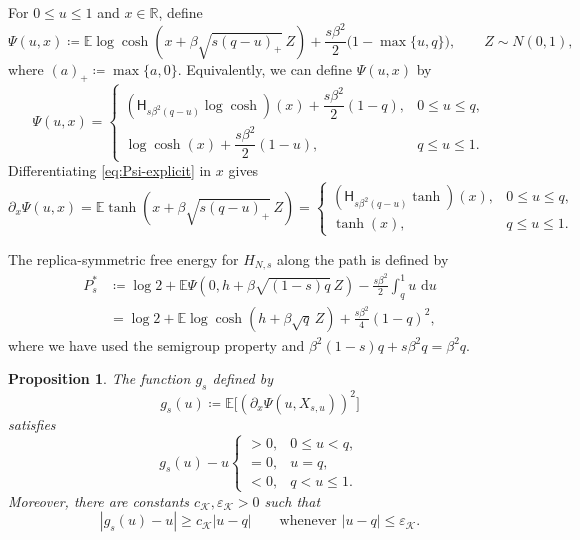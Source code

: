\documentclass[11pt]{article}
\newtheorem{proposition}[theorem]{Proposition}
\numberwithin{equation}{section}
\newcommand{\E}{\mathbb{E}}
\newcommand{\1}{\mathbf 1}
\newcommand{\cK}{\mathcal K}
\newcommand{\dd}{\,\mathrm d}
\begin{document}
For $0\le u\le1$ and $x\in\mathbb R$, define
\begin{equation}
 \Psi(u,x)
 \coloneqq
 \E\log\cosh\left(
 x+\beta\sqrt{s(q-u)_+}\,Z
 \right)
 +\frac{s\beta^2}{2}\bigl(1-\max\{u,q\}\bigr),
 \qquad Z\sim N(0,1),
 \label{eq:Psi-explicit}
\end{equation}
where $(a)_+\coloneqq\max\{a,0\}$.  Equivalently, we can define $\Psi (u,x)$ by
\[
 \Psi(u,x)
 =
 \begin{cases}
  (\mathsf H_{s\beta^2(q-u)}\log\cosh)(x)
  +\dfrac{s\beta^2}{2}(1-q),
  &0\le u\le q,\\[2mm]
  \log\cosh(x)+\dfrac{s\beta^2}{2}(1-u),
  &q\le u\le1.
 \end{cases}
\]
Differentiating \eqref{eq:Psi-explicit} in $x$ gives
\begin{equation}
 \partial_x\Psi(u,x)
 =
 \mathbb{E}\tanh\left(
 x+\beta\sqrt{s(q-u)_+}\,Z
 \right)
 =
 \begin{cases}
  (\mathsf H_{s\beta^2(q-u)}\tanh)(x),
      &0\le u\le q,\\
  \tanh(x),&q\le u\le1.
 \end{cases}
 \label{eq:Psi-x}
\end{equation}

The replica-symmetric free energy for $H_{N,s}$ along the path is defined by
\begin{align}
 P_s^*& \coloneqq\log2+
 \E\Psi(0,h+\beta\sqrt{(1-s)q}\,Z)
 -\frac{s\beta^2}{2}\int_q^1u\,\dd u
 \label{eq:scalartrial}\\
 &= \log2+\E\log\cosh(h+\beta\sqrt q\,Z)
 +\frac{s\beta^2}{4}(1-q)^2,
 \label{eq:RSpathvalue}
\end{align}
where we have used the semigroup property and
$\beta^2(1-s)q+s\beta^2q=\beta^2q$.


\begin{proposition}
\label{prop:pathRS}
The function $g_s$ defined by
\begin{equation}
 g_s(u)\coloneqq\E\bigl[(\partial_x\Psi(u,X_{s,u}))^2\bigr]
 \label{eq:gs-def}
\end{equation}
satisfies
\begin{equation}
 g_s(u)-u
 \begin{cases}
 >0,&0\le u<q,\\
 =0,&u=q,\\
 <0,&q<u\le1.
 \end{cases}
 \label{eq:ATsign}
\end{equation}
Moreover, there are constants $c_{\cK},\varepsilon_{\cK}>0$ such that
\begin{equation}
 |g_s(u)-u|\ge c_{\cK}|u-q|
 \qquad\text{whenever }|u-q|\le\varepsilon_{\cK}.
 \label{eq:linearATsign}
\end{equation}
\end{proposition}
\end{document}
